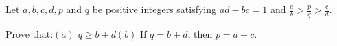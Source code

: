 Let $a,b,c,d,p$ and $q$ be positive integers satisfying $ad-bc=1$ and $\frac{a}{b}>\frac{p}{q}>\frac{c}{d}$.

Prove that:$(a)$ $q\ge b+d$$(b)$ If $q=b+d$,  then $p=a+c$.